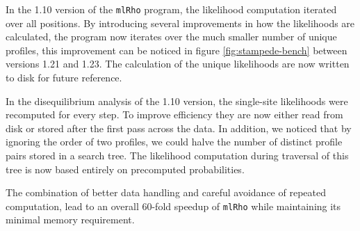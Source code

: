 \documentclass{sig-alternate}
\newcommand{\ty}{\texttt}
\begin{document}
In the 1.10 version of the \ty{mlRho} program, the likelihood computation iterated over all positions. By
introducing several improvements in how the likelihoods are calculated, the program now iterates over the much
smaller number of unique profiles, this improvement can be noticed in figure \ref{fig:stampede-bench} between
versions 1.21 and 1.23.
The calculation of the unique likelihoods are now written to disk for future reference.

In the disequilibrium analysis of the 1.10 version, the single-site likelihoods were recomputed for every
step. To improve efficiency they are now either read from disk or stored after the first pass across the
data. In addition, we noticed that by ignoring the order of two profiles, we could halve the number of
distinct profile pairs stored in a search tree. The likelihood computation during traversal of this tree is
now based entirely on precomputed probabilities.


The combination of better data handling and careful avoidance of repeated computation, lead to an overall 60-fold
speedup of \ty{mlRho} while maintaining its minimal memory requirement.
\end{document}
